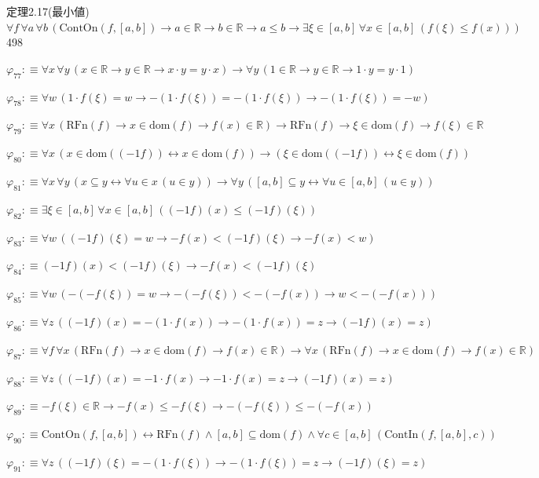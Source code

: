 \begin{fullproof}{定理2.17(最小値)}{$\forall f\,\forall a\,\forall b\,(\mathrm{ContOn}(f,[a,b]) \to a \in \mathbb{R} \to b \in \mathbb{R} \to a \leq b \to \exists \xi \in [a,b]\,\forall x \in [a,b]\,(f(\xi) \leq f(x)))$}{498}
\begin{abbrevlist}
\item $\varphi_{77} :\equiv \forall x\,\forall y\,(x \in \mathbb{R} \to y \in \mathbb{R} \to x \cdot y = y \cdot x) \to \forall y\,(1 \in \mathbb{R} \to y \in \mathbb{R} \to 1 \cdot y = y \cdot 1)$
\item $\varphi_{78} :\equiv \forall w\,(1 \cdot f(\xi) = w \to -(1 \cdot f(\xi)) = -(1 \cdot f(\xi)) \to -(1 \cdot f(\xi)) = -w)$
\item $\varphi_{79} :\equiv \forall x\,(\mathrm{RFn}(f) \to x \in \mathrm{dom}(f) \to f(x) \in \mathbb{R}) \to \mathrm{RFn}(f) \to \xi \in \mathrm{dom}(f) \to f(\xi) \in \mathbb{R}$
\item $\varphi_{80} :\equiv \forall x\,(x \in \mathrm{dom}((-1 f)) \leftrightarrow x \in \mathrm{dom}(f)) \to (\xi \in \mathrm{dom}((-1 f)) \leftrightarrow \xi \in \mathrm{dom}(f))$
\item $\varphi_{81} :\equiv \forall x\,\forall y\,(x \subseteq y \leftrightarrow \forall u \in x\,(u \in y)) \to \forall y\,([a,b] \subseteq y \leftrightarrow \forall u \in [a,b]\,(u \in y))$
\item $\varphi_{82} :\equiv \exists \xi \in [a,b]\,\forall x \in [a,b]\,((-1 f)(x) \leq (-1 f)(\xi))$
\item $\varphi_{83} :\equiv \forall w\,((-1 f)(\xi) = w \to -f(x) < (-1 f)(\xi) \to -f(x) < w)$
\item $\varphi_{84} :\equiv (-1 f)(x) < (-1 f)(\xi) \to -f(x) < (-1 f)(\xi)$
\item $\varphi_{85} :\equiv \forall w\,(-(-f(\xi)) = w \to -(-f(\xi)) < -(-f(x)) \to w < -(-f(x)))$
\item $\varphi_{86} :\equiv \forall z\,((-1 f)(x) = -(1 \cdot f(x)) \to -(1 \cdot f(x)) = z \to (-1 f)(x) = z)$
\item $\varphi_{87} :\equiv \forall f\,\forall x\,(\mathrm{RFn}(f) \to x \in \mathrm{dom}(f) \to f(x) \in \mathbb{R}) \to \forall x\,(\mathrm{RFn}(f) \to x \in \mathrm{dom}(f) \to f(x) \in \mathbb{R})$
\item $\varphi_{88} :\equiv \forall z\,((-1 f)(x) = -1 \cdot f(x) \to -1 \cdot f(x) = z \to (-1 f)(x) = z)$
\item $\varphi_{89} :\equiv -f(\xi) \in \mathbb{R} \to -f(x) \leq -f(\xi) \to -(-f(\xi)) \leq -(-f(x))$
\item $\varphi_{90} :\equiv \mathrm{ContOn}(f,[a,b]) \leftrightarrow \mathrm{RFn}(f) \land [a,b] \subseteq \mathrm{dom}(f) \land \forall c \in [a,b]\,(\mathrm{ContIn}(f,[a,b],c))$
\item $\varphi_{91} :\equiv \forall z\,((-1 f)(\xi) = -(1 \cdot f(\xi)) \to -(1 \cdot f(\xi)) = z \to (-1 f)(\xi) = z)$

\end{abbrevlist}
\end{fullproof}
